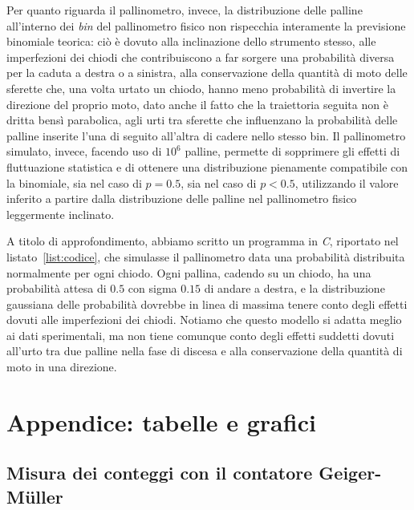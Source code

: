 \documentclass[10pt,oneside,a4paper]{article}
\begin{document}
Per quanto riguarda il pallinometro, invece, la distribuzione delle palline all'interno dei \emph{bin} del pallinometro fisico non rispecchia interamente la previsione binomiale teorica: ciò è dovuto alla inclinazione dello strumento stesso, alle imperfezioni dei chiodi che contribuiscono a far sorgere una probabilità diversa per la caduta a destra o a sinistra, alla conservazione della quantità di moto delle sferette che, una volta urtato un chiodo, hanno meno probabilità di invertire la direzione del proprio moto, dato anche il fatto che la traiettoria seguita non è dritta bensì parabolica, agli urti tra sferette che influenzano la probabilità delle palline inserite l'una di seguito all'altra di cadere nello stesso bin. Il pallinometro simulato, invece, facendo uso di $10^6$ palline, permette di sopprimere gli effetti di fluttuazione statistica e di ottenere una distribuzione pienamente compatibile con la binomiale, sia nel caso di $p = 0.5$, sia nel caso di $p<0.5$, utilizzando il valore inferito a partire dalla distribuzione delle palline nel pallinometro fisico leggermente inclinato. 

A titolo di approfondimento, abbiamo scritto un programma in \emph{C}, riportato nel listato~\ref{list:codice}, che simulasse il pallinometro data una probabilità distribuita normalmente per ogni chiodo. Ogni pallina, cadendo su un chiodo, ha una probabilità attesa di $0.5$ con sigma $0.15$ di andare a destra, e la distribuzione gaussiana delle probabilità dovrebbe in linea di massima tenere conto degli effetti dovuti alle imperfezioni dei chiodi. Notiamo che questo modello si adatta meglio ai dati sperimentali, ma non tiene comunque conto degli effetti suddetti dovuti all'urto tra due palline nella fase di discesa e alla conservazione della quantità di moto in una direzione.




\pagebreak

\section{Appendice: tabelle e grafici}

\subsection{Misura dei conteggi con il contatore Geiger-Müller}
\end{document}
